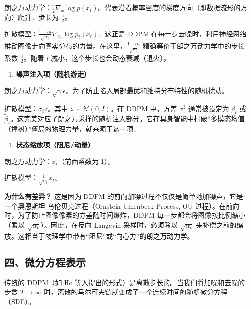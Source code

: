朗之万动力学：\(\frac{\gamma}{2}\nabla_x\log p(x_i)\)。代表沿着概率密度的梯度方向（即数据流形的方向）爬升，步长为 \(\frac{\gamma}{2}\)。

扩散模型：\(\frac{1-\alpha_t}{\sqrt{\alpha_t}}\nabla_{x_t}\log p_t(x_t)\)。这正是 DDPM 在每一步去噪时，利用神经网络推动图像走向真实分布的力量。在这里，\(\frac{1-\alpha_t}{\sqrt{\alpha_t}}\) 精确等价于朗之万动力学中的步长系数 \(\frac{\gamma}{2}\)。随着 \(t\) 减小，这个步长也会动态衰减（退火）。

\begin{enumerate}
\def\labelenumi{\arabic{enumi}.}
\setcounter{enumi}{1}
\tightlist
\item
  \textbf{噪声注入项（随机游走）}
\end{enumerate}

朗之万动力学：\(\sqrt{\gamma}\epsilon\)。为了防止陷入局部最优和维持分布特性的随机扰动。

扩散模型：\(\sigma_t z\)。其中 \(z\sim\mathcal{N}(0,I)\)。在 DDPM 中，方差 \(\sigma_t^2\) 通常被设定为 \(\beta_t\) 或 \(\tilde{\beta}_t\)。这完美对应了朗之万采样的随机注入部分。它在具身智能中打破``多模态均值（撞树）''僵局的物理力量，就来源于这一项。

\begin{enumerate}
\def\labelenumi{\arabic{enumi}.}
\setcounter{enumi}{2}
\tightlist
\item
  \textbf{状态缩放项（阻尼/动量）}
\end{enumerate}

朗之万动力学：\(x_i\)（前面系数为 1）。

扩散模型：\(\frac{1}{\sqrt{\alpha_t}}x_t\)。

\textbf{为什么有差异？} 这是因为 DDPM 的前向加噪过程不仅仅是简单地加噪声，它是一个奥恩斯坦-乌伦贝克过程（Ornstein-Uhlenbeck Process, OU 过程）。在前向时，为了防止图像像素的方差随时间爆炸，DDPM 每一步都会将图像按比例缩小（乘以 \(\sqrt{\alpha_t}\)）。因此，在反向 Langevin 采样时，必须除以 \(\sqrt{\alpha_t}\) 来补偿之前的缩放。这相当于物理学中带有``阻尼''或``向心力''的朗之万动力学。

\hypertarget{ux56dbux5faeux5206ux65b9ux7a0bux8868ux793a}{%
\subsection{四、微分方程表示}\label{ux56dbux5faeux5206ux65b9ux7a0bux8868ux793a}}

传统的 DDPM（如 Ho 等人提出的形式）是离散步长的。当我们将加噪和去噪的步数 \(T\to\infty\) 时，离散的马尔可夫链就变成了一个连续时间的随机微分方程（SDE）。

